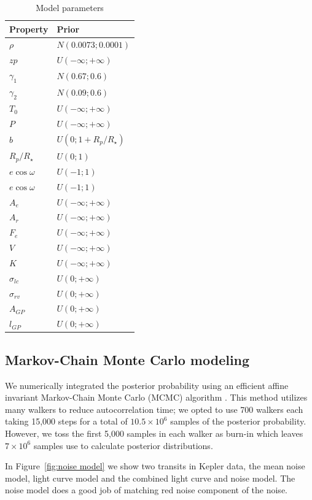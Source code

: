 \documentclass[apjl]{emulateapj}
\begin{document}
\begin{table}
\centering
\caption{Model parameters}\label{tab:priors}
\begin{tabular}{l l }
Property & Prior \\
\hline
$\rho$		&	$N(0.0073;0.0001)$ \\
$zp$				& 	$U(-\infty;+\infty)$\\
$\gamma_1$		&	$N(0.67;0.6)$ \\
$\gamma_2$		&	$N(0.09;0.6)$\\
$T_0$ & $U(-\infty;+\infty)$\\
$P$ & $U(-\infty;+\infty)$\\
$b$ & $U(0;1+R_{p}/R_{\star})$\\
$R_{p}/R_{\star}$ & $U(0;1)$ \\
$e\cos{\omega}$ &$U(-1;1)$ \\
$e\cos{\omega}$ & $U(-1;1)$\\
$A_e$ &$U(-\infty;+\infty)$ \\
$A_r$ & $U(-\infty;+\infty)$\\
$F_e$ & $U(-\infty;+\infty)$\\
$V$ &$U(-\infty;+\infty)$ \\
$K$ &$U(-\infty;+\infty)$ \\
$\sigma_{lc}$ & $U(0;+\infty)$\\
$\sigma_{rv}$ &$U(0;+\infty)$ \\
$A_{GP}$ &  $U(0;+\infty)$ \\
$l_{GP}$ &  $U(0;+\infty)$ \\
\hline
\end{tabular}
\end{table}

\subsection{Markov-Chain Monte Carlo modeling}
We numerically integrated the posterior probability using an efficient affine invariant Markov-Chain Monte Carlo (MCMC) algorithm \citep{goodman10,foreman13}.  This method utilizes many walkers to reduce autocorrelation time; we opted to use 700 walkers each taking 15,000 steps for a total of $10.5\times10^6$ samples of the posterior probability. However, we toss the first 5,000 samples in each walker as burn-in which leaves $7\times10^6$ samples use to calculate posterior distributions.

In Figure~\ref{fig:noise model} we show two transits in Kepler data, the mean noise model, light curve model and the combined light curve and noise model. The noise model does a good job of matching red noise component of the noise.
\end{document}
